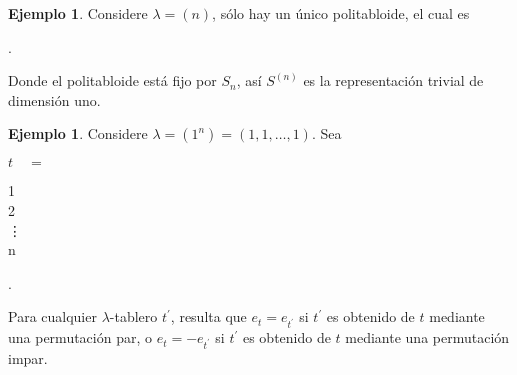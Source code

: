 \documentclass[12pt]{book}
\theoremstyle{definition}
\newtheorem{example}[theorem]{Ejemplo}
\newcounter{in}
\newcounter{ini}
\begin{document}
\begin{example}
  \label{n}
  Considere $\lambda=(n)$, sólo hay un único politabloide, el cual es
  \begin{center}
     \quad .
  \end{center}
Donde el politabloide está fijo por $S_{n}$, así $S^{(n)}$ es la
representación trivial de dimensión uno. 
\end{example}

\begin{example}
  \label{1n} 
  Considere $\lambda=(1^{n})=(1,1,\ldots,1)$. Sea
  
  \begin{center}
    \begin{minipage}[h]{0.1\linewidth}
      $t\quad=$
    \end{minipage}
    \begin{minipage}[h]{0.05\linewidth}
      \begin{ytableau}
        1\\
        2\\
        \vdots\\
        n
      \end{ytableau} 
    \end{minipage}.
  \end{center}

  Para cualquier $\lambda$-tablero $t^{'}$,
  resulta que $e_{t}=e_{t^{'}}$ si $t^{'}$ es obtenido de $t$ mediante una
  permutación par, o $e_{t}=-e_{t^{'}}$ si $t^{'}$ es obtenido de $t$
  mediante una permutación impar.
\end{example}
\end{document}
